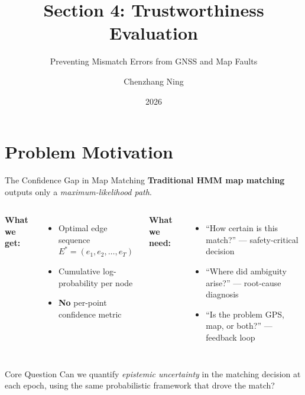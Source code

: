 \documentclass[10pt,aspectratio=169]{beamer}
\title[Trustworthiness Evaluation in CMM]{Section 4: Trustworthiness Evaluation}
\subtitle{Preventing Mismatch Errors from GNSS and Map Faults}
\author{Chenzhang Ning}
\date{2026}
\begin{document}
\frame{\titlepage}

\section{Problem Motivation}

\begin{frame}{The Confidence Gap in Map Matching}
  \textbf{Traditional HMM map matching} outputs only a \emph{maximum-likelihood path}.

  \vspace{0.6cm}
  \begin{columns}[T]
      \textbf{What we get:}
      \begin{itemize}
        \item Optimal edge sequence $E^* = (e_1, e_2, \dots, e_T)$
        \item Cumulative log-probability per node
        \item \textbf{No} per-point confidence metric
      \end{itemize}

      \textbf{What we need:}
      \begin{itemize}
        \item ``How certain is this match?'' — safety-critical decision
        \item ``Where did ambiguity arise?'' — root-cause diagnosis
        \item ``Is the problem GPS, map, or both?'' — feedback loop
      \end{itemize}
  \end{columns}

  \vspace{0.5cm}
  \begin{alertblock}{Core Question}
    Can we quantify \emph{epistemic uncertainty} in the matching decision at each
    epoch, using the same probabilistic framework that drove the match?
  \end{alertblock}
\end{frame}

\end{document}
